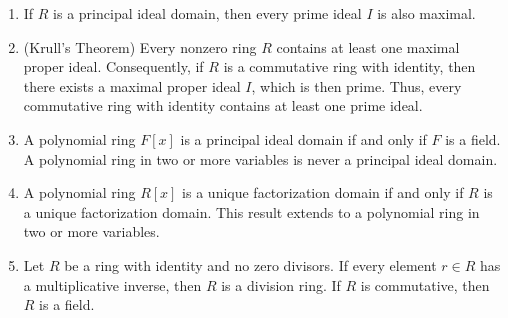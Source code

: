 \documentclass{article}
\begin{document}
\begin{enumerate}[resume = algebra]
{\begin{enumerate}[itemsep =-2pt,label = \arabic{*}.]
				\item Now assume that $R/I$ is a field, but assume to the contrary that $I$ is not a maximal ideal; i.e., assume there exists some \textit{proper} ideal $J \subsetneq R$ containing $I$ such that $I \neq J$. Then there exists some nonzero $x \in R/J$. Since $x \notin I$, $x + I \neq 0 + I$. Thus since $R/I$ is a field, there exists some nonzero coset $y + I \in R/I$ such that $(xy) + I= (x + I)(y + I) = 1 + I$. In particular, $xy - 1 \in I \subset J$ so that 
				\begin{equation*}
					(x + J)(y + J) = 1 + J \qquad \text{in $R/J$}. 
				\end{equation*}
				But since $x \in J$, $x + J = 0 + J$. Thus since $0 + J = 1 + J$, one must have $1 \in J$. But if $J$ contains $1$, then $J$ must be the whole ring $R$, which contradicts our hypothesis that $J$ is proper. Thus by contradiction, $I$ must be maximal. Now assume that $I$ is a maximal ideal. Let $x + I$ be a nonzero coset in $R/I$ (i.e., $x \notin I$), and consider the ideal $I + (x)$. Since $x \notin I$, $I + (x) \supsetneq I$, so that by maximality of $I$, $I + (x) = R$. Thus $I + (x)$ contains $1$. This means there exists some $i \in I$ and $r \in R$ such that $i + rx = 1 \implies rx = 1 - i\implies (r + I)(x + I) = 1 + I$. This implies that $(x + I)^{-1}= (r + I)$ so that $x + I$ has a multiplicative inverse. Thus since $x + I$ was an arbitrary nonzero coset, we conclude that $R/I$ is a field. 
			\end{enumerate}
		}
		\item If $R$ is a principal ideal domain, then every prime ideal $I$ is also maximal. 
		\item (Krull's Theorem) Every nonzero ring $R$ contains at least one maximal proper ideal. Consequently, if $R$ is a commutative ring with identity, then there exists a maximal proper ideal $I$, which is then prime. Thus, every commutative ring with identity contains at least one prime ideal. 
		\item A polynomial ring $F[x]$ is a principal ideal domain if and only if $F$ is a field. A polynomial ring in two or more variables is never a principal ideal domain.
		\item A polynomial ring $R[x]$ is a unique factorization domain if and only if $R$ is a unique factorization domain. This result extends to a polynomial ring in two or more variables. 
		\item Let $R$ be a ring with identity and no zero divisors. If every element $r \in R$ has a multiplicative inverse, then $R$ is a division ring. If $R$ is commutative, then $R$ is a field. 

\end{enumerate}
\end{document}
